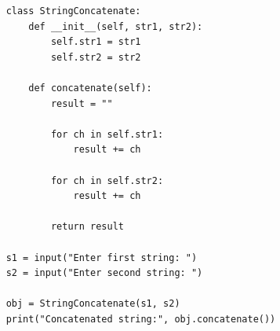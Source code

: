 \begin{verbatim}
    class StringConcatenate:
        def __init__(self, str1, str2):
            self.str1 = str1
            self.str2 = str2
    
        def concatenate(self):
            result = ""
            
            for ch in self.str1:
                result += ch
    
            for ch in self.str2:
                result += ch
    
            return result
    
    s1 = input("Enter first string: ")
    s2 = input("Enter second string: ")
    
    obj = StringConcatenate(s1, s2)
    print("Concatenated string:", obj.concatenate())
\end{verbatim}
